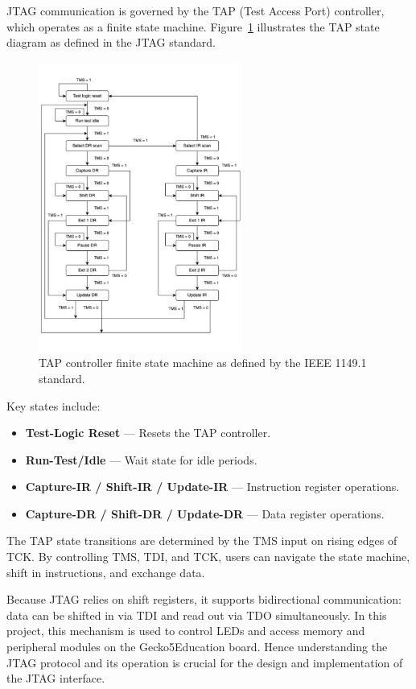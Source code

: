 \documentclass[a4paper,11pt,oneside]{report}
\newcommand{\boardName}{Gecko5Education \xspace}
\begin{document}
JTAG communication is governed by the TAP (Test Access Port) controller,  
which operates as a finite state machine.  
Figure~\ref{fig:tap-fsm} illustrates the TAP state diagram as defined in the JTAG standard.

\begin{figure}
    \centering
    \includegraphics[width=0.6\textwidth]{figures/TAP_FSM.pdf} %
    \caption{TAP controller finite state machine as defined by the IEEE 1149.1 standard.}
    \label{fig:tap-fsm}
\end{figure}

Key states include:  

\begin{itemize}
    \item \textbf{Test-Logic Reset} — Resets the TAP controller.  
    \item \textbf{Run-Test/Idle} — Wait state for idle periods.  
    \item \textbf{Capture-IR / Shift-IR / Update-IR} — Instruction register operations.  
    \item \textbf{Capture-DR / Shift-DR / Update-DR} — Data register operations.  
\end{itemize}

The TAP state transitions are determined by the TMS input on rising edges of TCK.  
By controlling TMS, TDI, and TCK, users can navigate the state machine,  
shift in instructions, and exchange data.  

Because JTAG relies on shift registers, it supports bidirectional communication:  
data can be shifted in via TDI and read out via TDO simultaneously.  
In this project, this mechanism is used to control LEDs  
and access memory and peripheral modules on the \boardName board.  
Hence understanding the JTAG protocol and its operation is crucial for the design and implementation of the JTAG interface.
\end{document}
